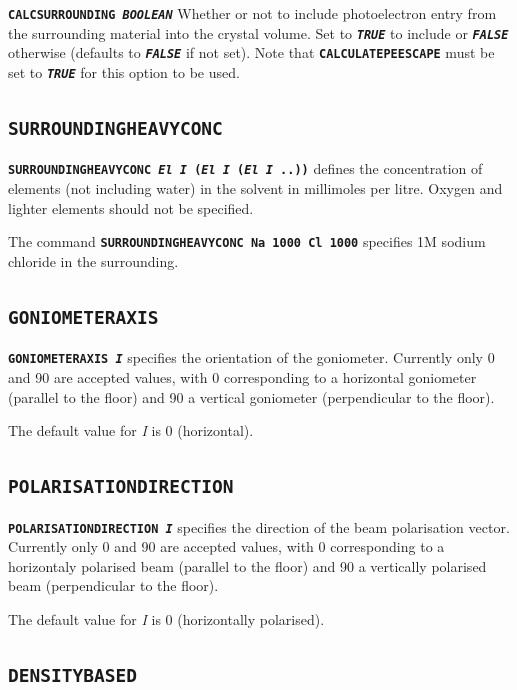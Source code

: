 \documentclass[a4paper]{article}
\newcommand{\Keyword}[1]{\texttt{\textbf{#1}}\xspace}
\begin{document}
\noindent \Keyword{CALCSURROUNDING \textit{BOOLEAN}}
Whether or not to include photoelectron entry from the surrounding material into the crystal volume. Set to \Keyword{\textit{TRUE}} to include or \Keyword{\textit{FALSE}} otherwise (defaults to \Keyword{\textit{FALSE}} if not set).
Note that \Keyword{CALCULATEPEESCAPE} must be set to \Keyword{\textit{TRUE}} for this option to be used.

\subsection{\Keyword{SURROUNDINGHEAVYCONC}}
\label{surroundingheavyconc}

\noindent \Keyword{SURROUNDINGHEAVYCONC \textit{El I} (\textit{El I} (\textit{El I} ..))}
defines the concentration of elements (not including water) in the solvent in millimoles per litre. Oxygen and lighter elements should not be specified.

The command \Keyword{SURROUNDINGHEAVYCONC Na 1000 Cl 1000} specifies 1M sodium chloride in the surrounding.


\subsection{\Keyword{GONIOMETERAXIS}}
\label{goniometeraxis}

\noindent \Keyword{GONIOMETERAXIS \textit{I}}
specifies the orientation of the goniometer. Currently only 0 and 90 are accepted values, with 0 corresponding to a horizontal
goniometer (parallel to the floor) and 90 a vertical goniometer (perpendicular to the floor).

The default value for \textit{I} is 0 (horizontal).

\subsection{\Keyword{POLARISATIONDIRECTION}}
\label{polarisationdirection}

\noindent \Keyword{POLARISATIONDIRECTION \textit{I}}
specifies the direction of the beam polarisation vector. Currently only 0 and 90 are accepted values, with 0 corresponding to a horizontaly 
polarised beam (parallel to the floor) and 90 a vertically polarised beam (perpendicular to the floor).

The default value for \textit{I} is 0 (horizontally polarised).

\subsection{\Keyword{DENSITYBASED}}
\label{oilbased}
\end{document}
